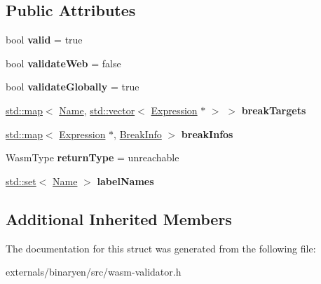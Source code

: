 \subsection*{Public Attributes}
\begin{DoxyCompactItemize}
\item 
\mbox{\label{structwasm_1_1_wasm_validator_a15bc2ec3a17c0a024309dbecf6679570}} 
bool {\bfseries valid} = true
\item 
\mbox{\label{structwasm_1_1_wasm_validator_a50d35c66aba8f17e11ab6521ce892936}} 
bool {\bfseries validate\+Web} = false
\item 
\mbox{\label{structwasm_1_1_wasm_validator_a30ce83d868057302ebb7e59c82b34ccf}} 
bool {\bfseries validate\+Globally} = true
\item 
\mbox{\label{structwasm_1_1_wasm_validator_a8fc7a9d90160e96898069967d6653eac}} 
\mbox{\hyperlink{classstd_1_1map}{std\+::map}}$<$ \mbox{\hyperlink{structwasm_1_1_name}{Name}}, \mbox{\hyperlink{classstd_1_1vector}{std\+::vector}}$<$ \mbox{\hyperlink{classwasm_1_1_expression}{Expression}} $\ast$ $>$ $>$ {\bfseries break\+Targets}
\item 
\mbox{\label{structwasm_1_1_wasm_validator_add22ecd00ea5b360461a11adeffe3261}} 
\mbox{\hyperlink{classstd_1_1map}{std\+::map}}$<$ \mbox{\hyperlink{classwasm_1_1_expression}{Expression}} $\ast$, \mbox{\hyperlink{structwasm_1_1_wasm_validator_1_1_break_info}{Break\+Info}} $>$ {\bfseries break\+Infos}
\item 
\mbox{\label{structwasm_1_1_wasm_validator_a7306d8eb422f23e567b0c1a0012bb3bd}} 
Wasm\+Type {\bfseries return\+Type} = unreachable
\item 
\mbox{\label{structwasm_1_1_wasm_validator_aa7d07ba731bb5124d5a3c5a247c3799a}} 
\mbox{\hyperlink{classstd_1_1set}{std\+::set}}$<$ \mbox{\hyperlink{structwasm_1_1_name}{Name}} $>$ {\bfseries label\+Names}
\end{DoxyCompactItemize}
\subsection*{Additional Inherited Members}


The documentation for this struct was generated from the following file\+:\begin{DoxyCompactItemize}
\item 
externals/binaryen/src/wasm-\/validator.\+h\end{DoxyCompactItemize}
